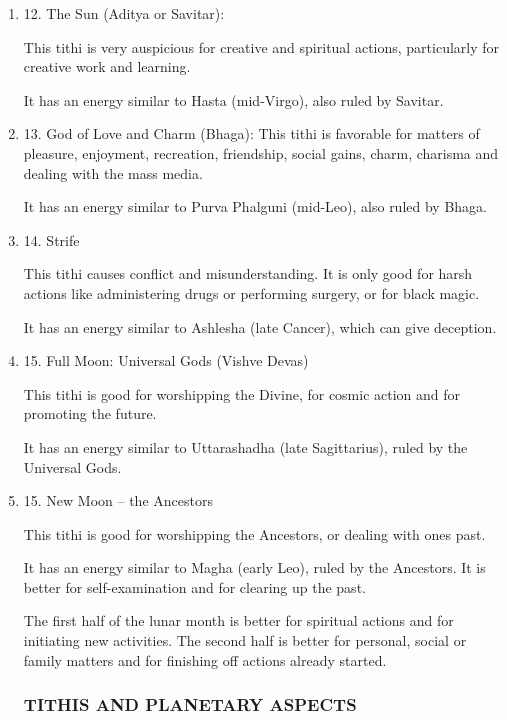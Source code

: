 \begin{enumerate}
 

\item[ ] 12. The Sun (Aditya or Savitar):

This tithi is very auspicious for creative and spiritual actions, particularly for creative work and learning.

It has an energy similar to Hasta (mid-Virgo), also ruled by Savitar.

 

\item[ ] 13. God of Love and Charm (Bhaga):
This tithi is favorable for matters of pleasure, enjoyment, recreation, friendship, social gains, charm, charisma and dealing with the mass media.

It has an energy similar to Purva Phalguni (mid-Leo), also ruled by Bhaga.

 

\item[ ] 14. Strife

This tithi causes conflict and misunderstanding. It is only good for harsh actions like administering drugs or performing surgery, or for black magic.

It has an energy similar to Ashlesha (late Cancer), which can give deception.

 

\item[ ] 15. Full Moon: Universal Gods (Vishve Devas)

This tithi is good for worshipping the Divine, for cosmic action and for promoting the future.

It has an energy similar to Uttarashadha (late Sagittarius), ruled by the Universal Gods.

 

\item[ ] 15. New Moon – the Ancestors

This tithi is good for worshipping the Ancestors, or dealing with ones past.

It has an energy similar to Magha (early Leo), ruled by the Ancestors. It is better for self-examination and for clearing up the past.

The first half of the lunar month is better for spiritual actions and for initiating new activities. The second half is better for personal, social or family matters and for finishing off actions already started.

 

\subsubsection{TITHIS AND PLANETARY ASPECTS}


\end{enumerate}
